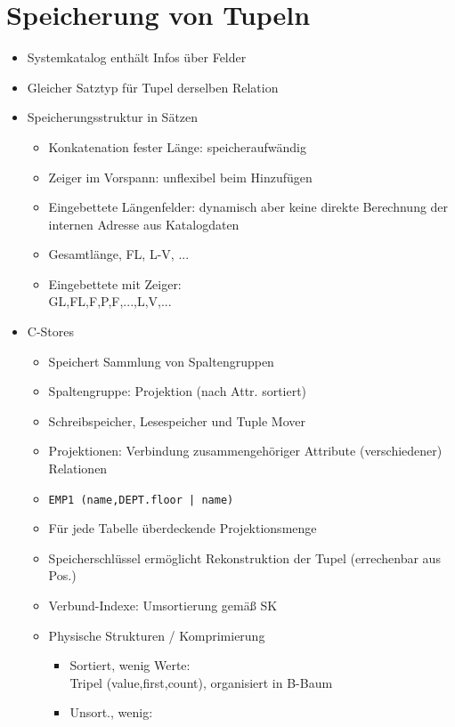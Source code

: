 \documentclass[11pt, paper=a4, twocolumn]{scrartcl}
\begin{document}
	\section{Speicherung von Tupeln}
		\begin{itemize}
			\item Systemkatalog enthält Infos über Felder
			\item Gleicher Satztyp für Tupel derselben Relation
			\item Speicherungsstruktur in Sätzen
				\begin{itemize}
					\item Konkatenation fester Länge: speicheraufwändig
					\item Zeiger im Vorspann: unflexibel beim 
						Hinzufügen
					\item Eingebettete Längenfelder: dynamisch aber 
						keine direkte Berechnung der internen 
						Adresse aus Katalogdaten
					\item Gesamtlänge, FL, L-V, ...
					\item Eingebettete mit Zeiger:\\
						GL,FL,F,P,F,...,L,V,...
				\end{itemize}
			\item C-Stores
				\begin{itemize}
					\item Speichert Sammlung von Spaltengruppen
					\item Spaltengruppe: Projektion (nach Attr. 
						sortiert)
					\item Schreibspeicher, Lesespeicher und 
						Tuple Mover
					\item Projektionen: Verbindung zusammengehöriger 
						Attribute (verschiedener) Relationen
					\item \texttt{EMP1 (name,DEPT.floor | name)}
					\item Für jede Tabelle überdeckende 
						Projektionsmenge
					\item Speicherschlüssel ermöglicht Rekonstruktion 
						der Tupel (errechenbar aus Pos.)
					\item Verbund-Indexe: Umsortierung gemäß SK
					\item Physische Strukturen / Komprimierung
						\begin{itemize}
							\item Sortiert, wenig Werte:\\
								Tripel 
								(value,first,count), 
								organisiert in B-Baum
							\item Unsort., wenig:\\

\end{itemize}
\end{itemize}
\end{itemize}
\end{document}
